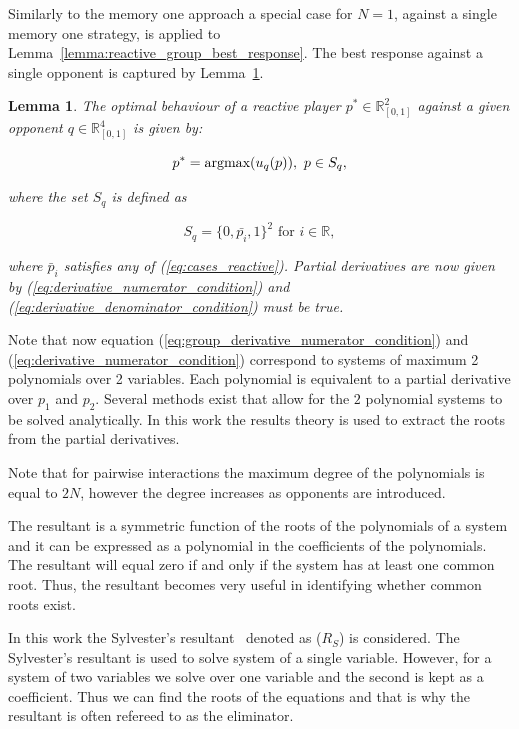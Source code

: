 \documentclass[10pt]{article}
\newcommand{\R}{\mathbb{R}}
\newtheorem{lemma}[theorem]{Lemma}
\begin{document}
Similarly to the memory one approach a special case for \(N=1\), against a single
memory one strategy, is applied to
Lemma~\ref{lemma:reactive_group_best_response}. The best response against a single
opponent is captured by Lemma~\ref{lemma:reactive_best_response}.

\begin{lemma}\label{lemma:reactive_best_response}
    The optimal behaviour of a reactive player \(p^* \in \R_{[0, 1]} ^ 2\) against a given
    opponent \(q \in \R_{[0, 1]} ^ 4\) is given by:

    \[p^* = \textnormal{argmax}(u_q(p)), \ p \in S_q,\]

    where the set \(S_q\) is defined as

    \[S_q = \{0, \bar{p_i}, 1 \} ^ 2 \text{ for } i \in \R,\]

    where \(\bar{p}_i\) satisfies any of (\ref{eq:cases_reactive}). Partial derivatives
    are now given by (\ref{eq:derivative_numerator_condition}) and
    (\ref{eq:derivative_denominator_condition}) must be true.
\end{lemma}

Note that now equation (\ref{eq:group_derivative_numerator_condition}) and (\ref{eq:derivative_numerator_condition})
correspond to systems of maximum 2 polynomials over 2 variables. Each polynomial is equivalent
to a partial derivative over \(p_1\) and \(p_2\). Several methods exist that allow
for the \(2\) polynomial systems to be solved analytically. In this work the results theory
is used to extract the roots from the partial derivatives.

Note that for pairwise interactions the maximum degree
of the polynomials is equal to \(2N\), however the degree increases as opponents
are introduced.

The resultant is a symmetric function of the roots of the polynomials of a system
and it can be expressed as a polynomial in the coefficients of the polynomials.
The resultant will equal zero if and only if the system has at least one common
root. Thus, the resultant becomes very useful in identifying whether common roots exist.

In this work the Sylvester's resultant~\cite{Akritas1991} denoted as (\(R_S\))
is considered. The Sylvester's resultant is used to solve system of a single
variable. However, for a system of two variables we solve over one variable and
the second is kept as a coefficient. Thus we can find the roots of the equations
and that is why the resultant is often refereed to as the eliminator.
\end{document}
